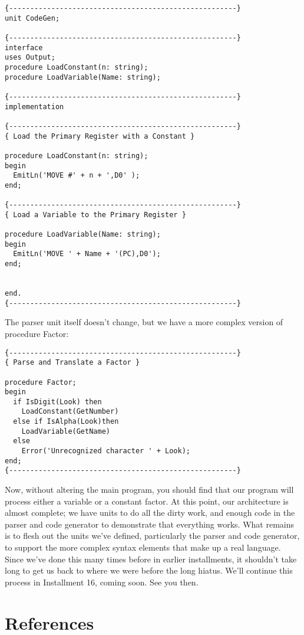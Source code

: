 \begin{verbatim}
{------------------------------------------------------}
unit CodeGen;

{------------------------------------------------------}
interface
uses Output;
procedure LoadConstant(n: string);
procedure LoadVariable(Name: string);

{------------------------------------------------------}
implementation

{------------------------------------------------------}
{ Load the Primary Register with a Constant }

procedure LoadConstant(n: string);
begin
  EmitLn('MOVE #' + n + ',D0' );
end;

{------------------------------------------------------}
{ Load a Variable to the Primary Register }

procedure LoadVariable(Name: string);
begin
  EmitLn('MOVE ' + Name + '(PC),D0');
end;


end.
{------------------------------------------------------}
\end{verbatim}

The parser unit itself doesn't change, but we have a more complex version of procedure Factor:

\begin{verbatim}
{------------------------------------------------------}
{ Parse and Translate a Factor }

procedure Factor;
begin
  if IsDigit(Look) then
    LoadConstant(GetNumber)
  else if IsAlpha(Look)then
    LoadVariable(GetName)
  else
    Error('Unrecognized character ' + Look);
end;
{------------------------------------------------------}
\end{verbatim}

Now, without altering the main program, you should find that our program will process either a variable or a constant factor. At this point, our architecture is almost complete; we have units to do all the dirty work, and enough code in the parser and code generator to demonstrate that everything works. What remains is to flesh out the units we've defined, particularly the parser and code generator, to support the more complex syntax elements that make up a real language. Since we've done this many times before in earlier installments, it shouldn't take long to get us back to where we were before the long hiatus. We'll continue this process in Installment 16, coming soon. See you then.

\section{References}

